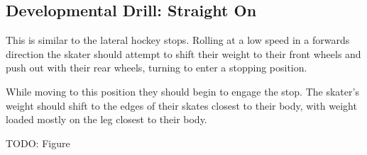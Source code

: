 \subsection*{Developmental Drill: Straight On}

This is similar to the lateral hockey stops. 
Rolling at a low speed in a forwards direction the skater should attempt to shift their weight to their front wheels and push out with their rear wheels, turning to enter a stopping position. 

While moving to this position they should begin to engage the stop.
The skater's weight should shift to the edges of their skates closest to their body, with weight loaded mostly on the leg closest to their body. 

{\color{red} TODO: Figure}
